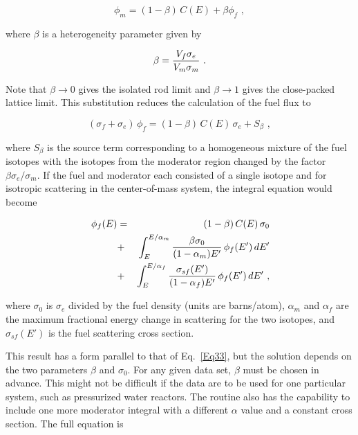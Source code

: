   \begin{equation}
    \phi_m=(1-\beta)\,{C(E)}+\beta\phi_f\,\,,
  \end{equation}

\noindent
where $\beta$ is a heterogeneity parameter given by

  \begin{equation}
    \beta={{V_f\sigma_e}\over{V_m\sigma_m}}\,\,.
  \end{equation}

\noindent
Note that $\beta\rightarrow 0$ gives the isolated rod limit and
$\beta\rightarrow 1$ gives the close-packed lattice limit.  This
substitution reduces the calculation of the fuel flux to

  \begin{equation}
    (\sigma_f+\sigma_e)\,\phi_f=(1-\beta)\,
    {C(E)\,\sigma_e }+S_\beta\,\,,
  \end{equation}

\noindent
where $S_\beta$ is the source term corresponding to a homogeneous mixture
of the fuel isotopes with the isotopes from the moderator region changed
by the factor $\beta\sigma_e/\sigma_m$.  If the fuel and moderator each
consisted of a single isotope and for isotropic scattering in the
center-of-mass system, the integral equation would become

  \begin{eqnarray}
    [\sigma_0+\sigma_t(E)]\,\phi_f(E)&=&
    (1-\beta)\,{C(E)\,\sigma_0}\nonumber\\
    &+&\int_E^{E/\alpha_m}{{\beta\sigma_0}\over
    {(1-\alpha_m)E'}}\,\phi_f(E')\,dE'\nonumber\\
    &+&\int_E^{E/\alpha_f}{{\sigma_{sf}(E')} \over
    {(1-\alpha_f)E'}}\,\phi_f(E')\,dE'\,\,,
  \label{Eq37}
  \end{eqnarray}

\noindent
where $\sigma_0$ is $\sigma_e$ divided by the fuel density (units are
barns/atom), $\alpha_m$ and $\alpha_f$ are the maximum fractional
energy change in scattering for the two isotopes, and $\sigma_{sf}(E')$
is the fuel scattering cross section.

This result has a form parallel to that of Eq.~\ref{Eq33}, but the
solution depends on the two parameters $\beta$ and $\sigma_0$.  For any
given data set, $\beta$ must be chosen in advance.  This might not be
difficult if the data are to be used for one particular system, such as
pressurized water reactors.  The routine also has the capability to
include one more moderator integral with a different $\alpha$ value and
a constant cross section.  The full equation is

